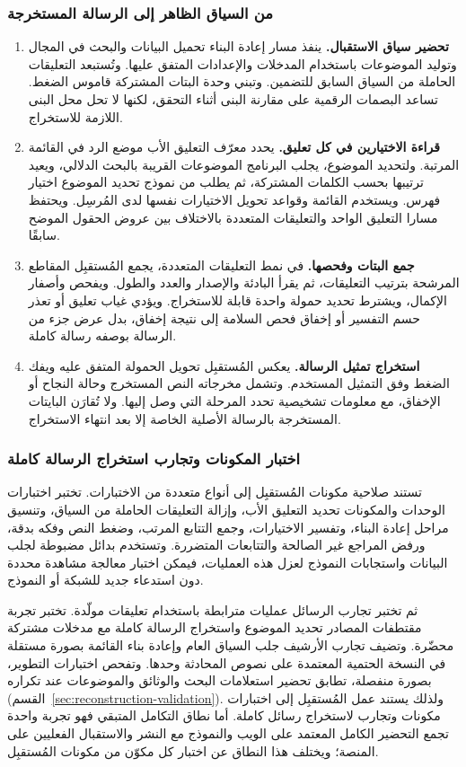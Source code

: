 \subsubsection{من السياق الظاهر إلى الرسالة المستخرجة}
\begin{enumerate}
\item \textbf{تحضير سياق الاستقبال.} ينفذ مسار إعادة البناء تحميل البيانات والبحث في المجال وتوليد الموضوعات باستخدام المدخلات والإعدادات المتفق عليها. وتُستبعد التعليقات الحاملة من السياق السابق للتضمين. وتبني وحدة البتات المشتركة قاموس الضغط. تساعد البصمات الرقمية على مقارنة البنى أثناء التحقق، لكنها لا تحل محل البنى اللازمة للاستخراج.
\item \textbf{قراءة الاختيارين في كل تعليق.} يحدد معرّف التعليق الأب موضع الرد في القائمة المرتبة. ولتحديد الموضوع، يجلب البرنامج الموضوعات القريبة بالبحث الدلالي، ويعيد ترتيبها بحسب الكلمات المشتركة، ثم يطلب من نموذج تحديد الموضوع اختيار فهرس. ويستخدم القائمة وقواعد تحويل الاختيارات نفسها لدى المُرسِل. ويحتفظ مسارا التعليق الواحد والتعليقات المتعددة بالاختلاف بين عروض الحقول الموضح سابقًا.
\item \textbf{جمع البتات وفحصها.} في نمط التعليقات المتعددة، يجمع المُستقبِل المقاطع المرشحة بترتيب التعليقات، ثم يقرأ البادئة والإصدار والعدد والطول. ويفحص  وأصفار الإكمال، ويشترط تحديد حمولة واحدة قابلة للاستخراج. ويؤدي غياب تعليق أو تعذر حسم التفسير أو إخفاق فحص السلامة إلى نتيجة إخفاق، بدل عرض جزء من الرسالة بوصفه رسالة كاملة.
\item \textbf{استخراج تمثيل الرسالة.} يعكس المُستقبِل تحويل الحمولة المتفق عليه ويفك الضغط وفق التمثيل المستخدم. وتشمل مخرجاته النص المستخرج وحالة النجاح أو الإخفاق، مع معلومات تشخيصية تحدد المرحلة التي وصل إليها. ولا تُقارَن البايتات المستخرجة بالرسالة الأصلية الخاصة إلا بعد انتهاء الاستخراج.
\end{enumerate}

\subsubsection{اختبار المكونات وتجارب استخراج الرسالة كاملة}
تستند صلاحية مكونات المُستقبِل إلى أنواع متعددة من الاختبارات. تختبر اختبارات الوحدات والمكونات تحديد التعليق الأب، وإزالة التعليقات الحاملة من السياق، وتنسيق مراحل إعادة البناء، وتفسير الاختيارات، وجمع التتابع المرتب، وضغط النص وفكه بدقة، ورفض المراجع غير الصالحة والتتابعات المتضررة. وتستخدم بدائل مضبوطة لجلب البيانات واستجابات النموذج لعزل هذه العمليات، فيمكن اختبار معالجة مشاهدة محددة دون استدعاء جديد للشبكة أو النموذج.

ثم تختبر تجارب الرسائل عمليات مترابطة باستخدام تعليقات مولّدة. تختبر تجربة مقتطفات المصادر تحديد الموضوع واستخراج الرسالة كاملة مع مدخلات مشتركة محضّرة. وتضيف تجارب الأرشيف جلب السياق العام وإعادة بناء القائمة بصورة مستقلة في النسخة الحتمية المعتمدة على نصوص المحادثة وحدها. وتفحص اختبارات التطوير، بصورة منفصلة، تطابق تحضير استعلامات البحث والوثائق والموضوعات عند تكراره (القسم~\ref{sec:reconstruction-validation}). ولذلك يستند عمل المُستقبِل إلى اختبارات مكونات وتجارب لاستخراج رسائل كاملة. أما نطاق التكامل المتبقي فهو تجربة واحدة تجمع التحضير الكامل المعتمد على الويب والنموذج مع النشر والاستقبال الفعليين على المنصة؛ ويختلف هذا النطاق عن اختبار كل مكوّن من مكونات المُستقبِل.
